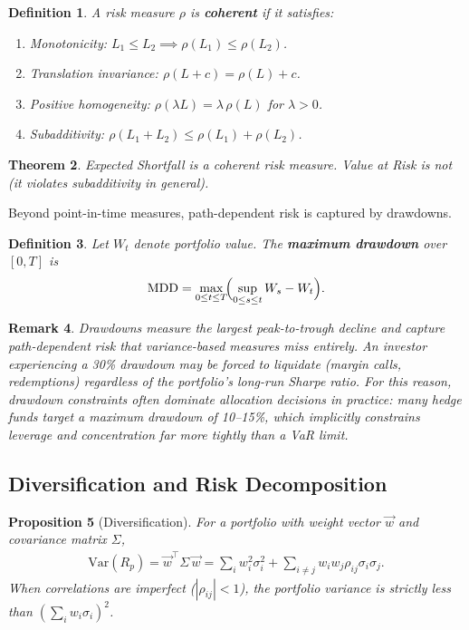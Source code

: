 \documentclass{report}
\theoremstyle{spacedplain}
\newtheorem{theorem}{Theorem}[section]
\newtheorem{proposition}[theorem]{Proposition}
\theoremstyle{spaceddefinition}
\newtheorem{definition}[theorem]{Definition}
\theoremstyle{spacedremark}
\newtheorem{remark}[theorem]{Remark}
\begin{document}
\begin{definition}
A risk measure $\rho$ is \textbf{coherent} if it satisfies:
\begin{enumerate}
    \item \emph{Monotonicity:} $L_1 \leq L_2 \implies \rho(L_1) \leq \rho(L_2)$.
    \item \emph{Translation invariance:} $\rho(L + c) = \rho(L) + c$.
    \item \emph{Positive homogeneity:} $\rho(\lambda L) = \lambda\,\rho(L)$ for $\lambda > 0$.
    \item \emph{Subadditivity:} $\rho(L_1 + L_2) \leq \rho(L_1) + \rho(L_2)$.
\end{enumerate}
\end{definition}

\begin{theorem}
Expected Shortfall is a coherent risk measure. Value at Risk is not (it violates subadditivity in general).
\end{theorem}

Beyond point-in-time measures, path-dependent risk is captured by drawdowns.

\begin{definition}
Let $W_t$ denote portfolio value. The \textbf{maximum drawdown} over $[0,T]$ is
\begin{align}
    \text{MDD} = \max_{0 \leq t \leq T}\!\Bigl(\sup_{0 \leq s \leq t} W_s - W_t\Bigr).
\end{align}
\end{definition}

\begin{remark}
Drawdowns measure the largest peak-to-trough decline and capture path-dependent risk that variance-based measures miss entirely. An investor experiencing a 30\% drawdown may be forced to liquidate (margin calls, redemptions) regardless of the portfolio's long-run Sharpe ratio. For this reason, drawdown constraints often dominate allocation decisions in practice: many hedge funds target a maximum drawdown of 10--15\%, which implicitly constrains leverage and concentration far more tightly than a VaR limit.
\end{remark}


\subsection{Diversification and Risk Decomposition}

\begin{proposition}[Diversification]
For a portfolio with weight vector $\vec{w}$ and covariance matrix $\Sigma$,
\begin{align}
    \text{Var}(R_p) = \vec{w}^\top \Sigma\, \vec{w} = \sum_i w_i^2 \sigma_i^2 + \sum_{i \neq j} w_i w_j \rho_{ij}\sigma_i\sigma_j.
\end{align}
When correlations are imperfect ($|\rho_{ij}| < 1$), the portfolio variance is strictly less than $(\sum_i w_i\sigma_i)^2$.
\end{proposition}
\end{document}
